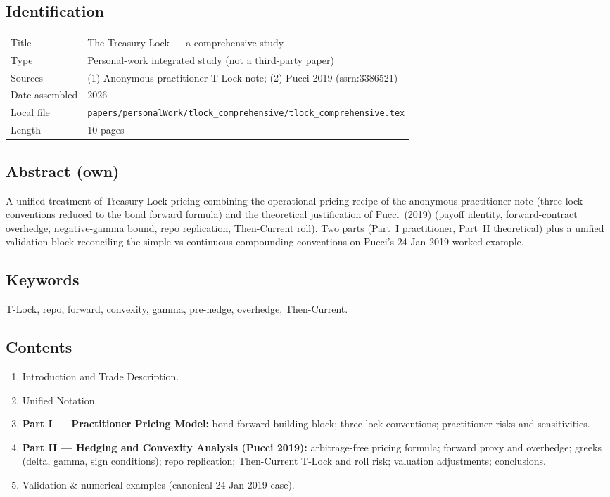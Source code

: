 \documentclass[11pt,a4paper]{article}
\begin{document}
\subsection*{Identification}
\begin{tabular}{@{}p{3.5cm}p{11cm}@{}}
\toprule
Title           & The Treasury Lock --- a comprehensive study \\
Type            & Personal-work integrated study (not a third-party paper) \\
Sources         & (1) Anonymous practitioner T-Lock note; (2) Pucci 2019 (ssrn:3386521) \\
Date assembled  & 2026 \\
Local file      & \texttt{papers/personalWork/tlock\_comprehensive/tlock\_comprehensive.tex} \\
Length          & 10 pages \\
\bottomrule
\end{tabular}

\subsection*{Abstract (own)}
A unified treatment of Treasury Lock pricing combining the operational
pricing recipe of the anonymous practitioner note (three lock
conventions reduced to the bond forward formula) and the theoretical
justification of Pucci~(2019) (payoff identity, forward-contract
overhedge, negative-gamma bound, repo replication, Then-Current
roll). Two parts (Part~I practitioner, Part~II theoretical) plus a
unified validation block reconciling the simple-vs-continuous
compounding conventions on Pucci's 24-Jan-2019 worked example.

\subsection*{Keywords}
T-Lock, repo, forward, convexity, gamma, pre-hedge, overhedge,
Then-Current.

\subsection*{Contents}
\begin{enumerate}[noitemsep]
  \item Introduction and Trade Description.
  \item Unified Notation.
  \item \textbf{Part I --- Practitioner Pricing Model:} bond forward
        building block; three lock conventions; practitioner risks
        and sensitivities.
  \item \textbf{Part II --- Hedging and Convexity Analysis (Pucci 2019):}
        arbitrage-free pricing formula; forward proxy and overhedge;
        greeks (delta, gamma, sign conditions); repo replication;
        Then-Current T-Lock and roll risk; valuation adjustments;
        conclusions.
  \item Validation \& numerical examples (canonical 24-Jan-2019 case).
\end{enumerate}
\end{document}
